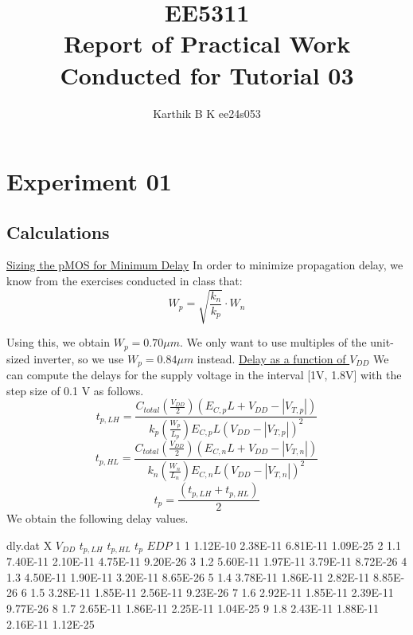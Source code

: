 \documentclass[12pt,a4paper]{article}
\begin{document}
\title{EE5311 \\ Report of Practical Work Conducted for Tutorial 03}
\author{Karthik B K ee24s053}
\maketitle

\section{Experiment 01}
\subsection{Calculations}
\noindent \underline{Sizing the pMOS for Minimum Delay} \newline
In order to minimize propagation delay, we know from the exercises conducted in class that:
\begin{equation}
    W_p = \sqrt{\frac{k_n}{k_p}} \cdot W_n
\end{equation}

\noindent Using this, we obtain $W_p = 0.70 \mu m$. We only want to use multiples of the unit-sized inverter, so we use $W_p = 0.84 \mu m$ instead.\newline \newline 
\noindent \underline{Delay as a function of $V_{DD}$} \newline
\noindent We can compute the delays for the supply voltage in the interval [1V, 1.8V] with the step size of 0.1 V as follows.
\begin{equation}
    t_{p, LH} = \frac{C_{total}(\frac{V_{DD}}{2})(E_{C,p}L+V_{DD}-|V_{T,p}|)}{k_p(\frac{W_p}{L_p})E_{C,p}L(V_{DD} - |V_{T,p}|)^2}
\end{equation}
\begin{equation}
    t_{p, HL} = \frac{C_{total}(\frac{V_{DD}}{2})(E_{C,n}L+V_{DD}-|V_{T,n}|)}{k_n(\frac{W_n}{L_n})E_{C,n}L(V_{DD} - |V_{T,n}|)^2}
\end{equation}
\begin{equation}
    t_p = \frac{(t_{p,LH} + t_{p,HL})}{2}
\end{equation}
\noindent We obtain the following delay values.
\begin{filecontents}{dly.dat}
X   $V_{DD}$    $t_{p,LH}$  $t_{p,HL}$  $t_{p}$     $EDP$
1	1	        1.12E-10	2.38E-11	6.81E-11	1.09E-25
2	1.1	        7.40E-11	2.10E-11	4.75E-11	9.20E-26
3	1.2	        5.60E-11	1.97E-11	3.79E-11	8.72E-26
4	1.3	        4.50E-11	1.90E-11	3.20E-11	8.65E-26
5	1.4         3.78E-11	1.86E-11	2.82E-11	8.85E-26
6	1.5         3.28E-11	1.85E-11	2.56E-11	9.23E-26
7	1.6         2.92E-11	1.85E-11	2.39E-11	9.77E-26
8	1.7         2.65E-11	1.86E-11	2.25E-11	1.04E-25
9	1.8         2.43E-11	1.88E-11	2.16E-11	1.12E-25
\end{filecontents}
\end{document}
